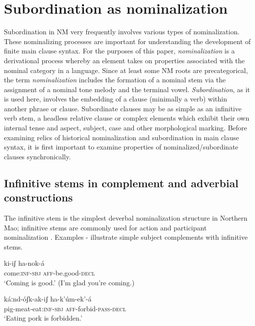 \documentclass[output=paper]{langsci/langscibook}
\begin{document}
\section{Subordination as nominalization}\label{sec:mahland:2}

Subordination in NM very frequently involves various types of nominalization. These nominalizing processes are important for understanding the development of finite main clause syntax. For the purposes of this paper, \textit{nominalization} is a derivational process whereby an element takes on properties associated with the nominal category in a language. Since at least some NM roots are precategorical, the term \textit{nominalization} includes the formation of a nominal stem via the assignment of a nominal tone melody and the terminal vowel. \textit{Subordination}, as it is used here, involves the embedding of a clause (minimally a verb) within another phrase or clause. Subordinate clauses may be as simple as an infinitive verb stem, a headless relative clause or complex elements which exhibit their own internal tense and aspect, subject, case and other morphological marking. Before examining relics of historical nominalization and subordination in main clause syntax, it is first important to examine properties of nominalized/subordinate clauses synchronically.

\subsection{Infinitive stems in complement and adverbial constructions}\label{sec:mahland:2.1}

  The infinitive stem is the simplest deverbal nominalization structure in Northern Mao; infinitive stems are commonly used for action and participant nominalization \citep[222]{Ahland2012}. Examples - illustrate simple subject complements with infinitive stems. 

\ea\label{ex:mahland:33}
\gll ki-iʃ                 ha-nok-á   \\
come:\textsc{inf-sbj}     \textsc{aff}{}-be.good-\textsc{decl} \\
\glt `Coming is good.' (I'm glad you're coming.)
\z

\ea\label{ex:mahland:34}
\gll káːnd-óʃk-ak-iʃ          ha-k'úm-{\downstep}ek'-á\\
pig-meat-eat:\textsc{inf-sbj}   \textsc{aff}{}-forbid-\textsc{pass-decl} \\
\glt `Eating pork is forbidden.'
\z
\end{document}
